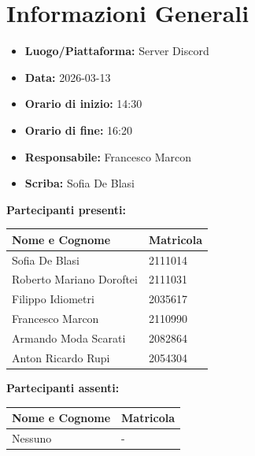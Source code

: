\section{Informazioni Generali}
\begin{itemize}
    \item \textbf{Luogo/Piattaforma:} Server Discord
    \item \textbf{Data:} 2026-03-13
    \item \textbf{Orario di inizio:} 14:30
    \item \textbf{Orario di fine:} 16:20
    \item \textbf{Responsabile:} Francesco Marcon
    \item \textbf{Scriba:} Sofia De Blasi
\end{itemize}

\vspace{0.5cm}
\textbf{Partecipanti presenti:}
\begin{table}[ht]
    \centering
    \renewcommand{\arraystretch}{1.2}
    \begin{tabularx}{\textwidth}{X l}
        \toprule
        \textbf{Nome e Cognome} & \textbf{Matricola} \\
        \midrule
        Sofia De Blasi & 2111014 \\
        Roberto Mariano Doroftei & 2111031 \\
        Filippo Idiometri & 2035617 \\
        Francesco Marcon & 2110990 \\
        Armando Moda Scarati & 2082864 \\
        Anton Ricardo Rupi & 2054304 \\
        \bottomrule
    \end{tabularx}
\end{table}

\vspace{0.5cm}
\textbf{Partecipanti assenti:}
\begin{table}[ht]
    \centering
    \renewcommand{\arraystretch}{1.2}
    \begin{tabularx}{\textwidth}{X l}
        \toprule
        \textbf{Nome e Cognome} & \textbf{Matricola} \\
        \midrule
        Nessuno & - \\
        \bottomrule
    \end{tabularx}
\end{table}

